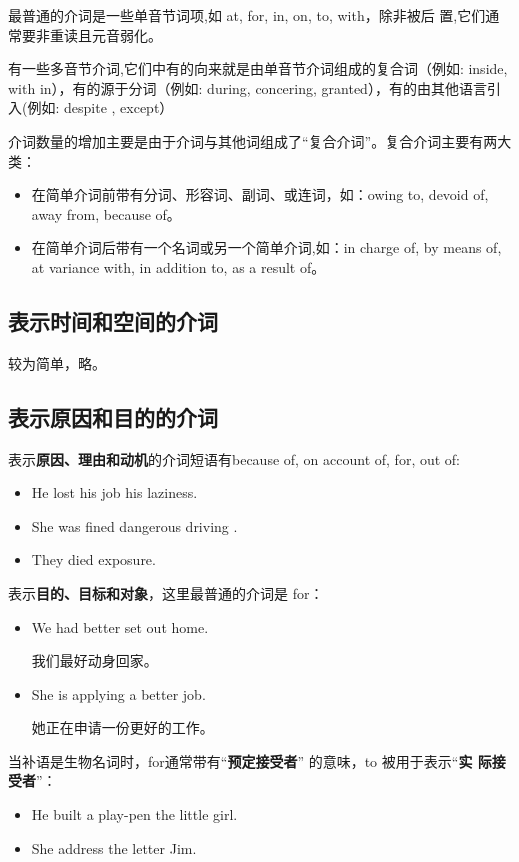 最普通的介词是一些单音节词项,如 at, for, in, on, to, with，除非被后
置,它们通常要非重读且元音弱化。

有一些多音节介词,它们中有的向来就是由单音节介词组成的复合词（例如: inside,
with in），有的源于分词（例如: during, concering, granted），有的由其他语言引
入(例如: despite , except）

介词数量的增加主要是由于介词与其他词组成了“复合介词”。复合介词主要有两大类：
\begin{itemize}
\item 在简单介词前带有分词、形容词、副词、或连词，如：owing to, devoid of, away
  from, because of。
\item 在简单介词后带有一个名词或另一个简单介词,如：in charge of, by means of,
  at variance with, in addition to, as a result of。
\end{itemize}

\subsection{表示时间和空间的介词}

较为简单，略。

\subsection{表示原因和目的的介词}

表示\textbf{原因、理由和动机}的介词短语有because of, on account of, for, out of:
\begin{itemize}
\item He lost his job  his laziness.
\item She was fined  dangerous driving .
\item They died  exposure.
\end{itemize}

表示\textbf{目的、目标和对象}，这里最普通的介词是 for：
\begin{itemize}
\item We had better set out  home.

  我们最好动身回家。

\item She is applying  a better job.

  她正在申请一份更好的工作。
\end{itemize}
当补语是生物名词时，for通常带有“\textbf{预定接受者}” 的意味，to 被用于表示“\textbf{实
  际接受者}”：
\begin{itemize}
\item He built a play-pen  the little girl.

\item She address the letter  Jim.
\end{itemize}


